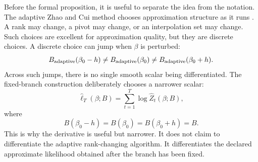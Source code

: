 \documentclass[11pt]{article}
\numberwithin{equation}{section}
\newcommand{\widehatell}{\widehat\ell}
\begin{document}
Before the formal proposition, it is useful to separate the idea from the
notation.  The adaptive Zhao and Cui method chooses approximation structure as
it runs \cite{zhao2024ttsequential}.  A rank may change, a pivot may change, or
an interpolation set may change.  Such choices are excellent for approximation
quality, but they are discrete choices.  A discrete choice can jump when
\(\beta\) is perturbed:
\begin{equation}
    B_{\rm adaptive}(\beta_0-h)
    \ne
    B_{\rm adaptive}(\beta_0)
    \ne
    B_{\rm adaptive}(\beta_0+h).
    \label{eq:p26-deriv-story-1}
\end{equation}
Across such jumps, there is no single smooth scalar being differentiated.  The
fixed-branch construction deliberately chooses a narrower scalar:
\begin{equation}
    \widehatell_T(\beta;B)
    =
    \sum_{t=1}^{T}\log\widehat Z_t(\beta;B),
    \label{eq:p26-deriv-story-2}
\end{equation}
where
\begin{equation}
    B(\beta_0-h)=B(\beta_0)=B(\beta_0+h)=B.
    \label{eq:p26-deriv-story-3}
\end{equation}
This is why the derivative is useful but narrower.  It does not claim to
differentiate the adaptive rank-changing algorithm.  It differentiates the
declared approximate likelihood obtained after the branch has been fixed.
\end{document}
